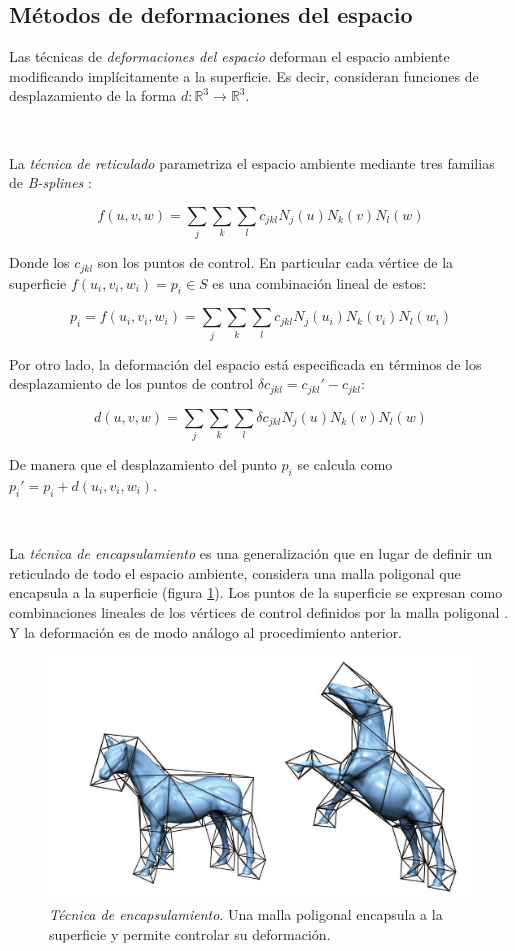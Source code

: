 \documentclass{article}
\begin{document}
\subsection{Métodos de deformaciones del espacio}
Las técnicas de \emph{deformaciones del espacio} deforman el espacio ambiente 
modificando implícitamente a la superficie. Es decir, consideran funciones 
de desplazamiento de la forma $d: \mathbb{R}^3 \rightarrow \mathbb{R}^3$.

\

La \emph{técnica de reticulado} parametriza el espacio ambiente 
mediante tres familias de \emph{B-splines} \cite{G:2015}:

$$f(u,v,w) = \sum_j \sum_k \sum_l c_{jkl} N_j(u) N_k(v) N_l(w)$$

Donde los $c_{jkl}$ son los puntos de control. En particular cada vértice de 
la superficie $f(u_i, v_i, w_i) = p_i \in S$ es una combinación lineal 
de estos:

$$p_i = f(u_i, v_i, w_i) = \sum_j \sum_k \sum_l c_{jkl} N_j(u_i) N_k(v_i) N_l(w_i)$$

Por otro lado, la deformación del espacio está especificada en términos 
de los desplazamiento de los puntos de control $\delta c_{jkl} = c_{jkl}' - c_{jkl}$:

$$d(u,v,w) = \sum_j \sum_k \sum_l \delta c_{jkl} N_j(u) N_k(v) N_l(w)$$

De manera que el desplazamiento del punto $p_i$ se calcula como $p_i' = 
p_i + d(u_i,v_i,w_i)$.

\

La \emph{técnica de encapsulamiento} es una generalización que en lugar 
de definir un reticulado de todo el espacio ambiente, considera una malla 
poligonal que encapsula a la superficie (figura \ref{fig:caballo}). Los 
puntos de la superficie se expresan como combinaciones lineales de los 
vértices de control definidos por la malla poligonal \cite{L:2008}. Y la 
deformación es de modo análogo al procedimiento anterior.

\begin{figure}
	\includegraphics[scale=.5]{caballo.png} %
	\caption{\emph{Técnica de encapsulamiento}. Una malla poligonal 
	encapsula a la superficie y permite controlar su deformación.}%
	\label{fig:caballo} %
\end{figure}
\end{document}

